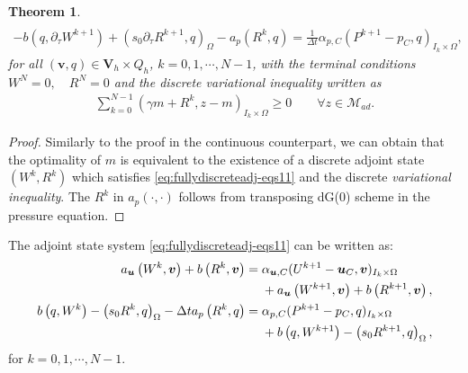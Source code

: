 \documentclass{amsart}
\newcommand{\ta}{\tau}
\newtheorem{theorem}{Theorem}[section]
\newcommand{\mc}[1]{\mathcal{#1}}
\newcommand{\LRp}[1]{\left( #1 \right)}
\begin{document}
{\begin{theorem}
\begin{subequations}
\begin{align}
			\\
			\label{eq:fullydiscreteadj-eq23}
			-b \LRp{q, \partial_\ta {W}^{k+1}} + \LRp{s_0 \partial_\ta {R}^{k+1}, q}_{\Omega} - a_p\LRp{ {R}^{k}, q} = \frac{1}{\Delta t} \alpha_{p, C} ({P}^{k+1} - p_C, q)_{I_k \times \Omega},
		\end{align}
	\end{subequations}
	for all $\LRp{\boldsymbol{v}, q} \in \boldsymbol{V}_h \times Q_h$, $k=0,1,\cdots,N-1$, with the terminal conditions $W^N = 0, \quad R^N = 0$ and the discrete \textit{variational inequality} written as 
		\begin{align}
			\label{eq:varineq}
			\sum_{k=0}^{N-1}(\gamma {m}+ R^{k},z - {m})_{I_k\times \Omega} \ge 0 \qquad \forall z \in \mc{M}_{ad}. %
		\end{align}
\end{theorem}
\begin{proof}
	Similarly to the proof in the continuous counterpart, we can obtain that the optimality of $m$ is equivalent to the existence of a discrete adjoint state $({W}^{k}, {R}^{k})$ which satisfies \eqref{eq:fullydiscreteadj-eqs11} and the discrete \textit{variational inequality}. The $R^k$ in $a_p(\cdot, \cdot)$ follows from transposing dG(0) scheme in the pressure equation. 
\end{proof}
The adjoint state system \eqref{eq:fullydiscreteadj-eqs11} can be written as:
\begin{subequations}
	\label{eq:fullydiscreteadj-eqs11a}
	\begin{align}
		\label{eq:fullydiscreteadj-eq12a}
		  a_{\boldsymbol{u}} \LRp{W^{k}, \boldsymbol{v}} + b \LRp{R^{k}, \boldsymbol{v}} &=  \alpha_{\boldsymbol{u}, C}  (U^{k+1} - \boldsymbol{u}_{C}, \boldsymbol{v})_{I_k \times \Omega} \\
		  \notag &\quad \ + a_{\boldsymbol{u}} \LRp{W^{k+1}, \boldsymbol{v}} + b \LRp{R^{k+1}, \boldsymbol{v}},
		\\
		\label{eq:fullydiscreteadj-eq23a}
		b \LRp{q,W^{k}} - \LRp{s_0 R^{k}, q}_{\Omega} - \Delta t a_p\LRp{ R^{k}, q} &= \alpha_{p, C}  (P^{k+1} - p_C, q)_{I_k \times \Omega}  \\
		\notag &\quad \ + b \LRp{q, W^{k+1}} - \LRp{s_0 R^{k+1}, q}_{\Omega},
	\end{align}    
\end{subequations}
for $k=0,1,\cdots,N-1$.
}
\end{document}
